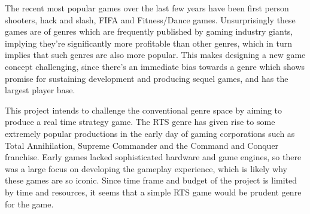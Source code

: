 The recent most popular games over the last few years have been first person shooters, hack and slash, FIFA and  Fitness/Dance games. Unsurprisingly these games are of genres which are frequently published by gaming industry giants, implying they're significantly more profitable than other genres, which in turn implies that such genres are also more popular. This makes designing a new game concept challenging, since there's an immediate bias towards a genre which shows promise for sustaining development and producing sequel games, and has the largest player base. 

This project intends to challenge the conventional genre space by aiming to produce a real time strategy game. The RTS genre has given rise to some extremely popular productions in the early day of gaming corporations such as Total Annihilation, Supreme Commander and the Command and Conquer franchise. Early games lacked sophisticated hardware and game engines, so there was a large focus on developing the gameplay experience, which is likely why these games are so iconic. Since time frame and budget of the project is limited by time and resources, it seems that a simple RTS game would be prudent genre for the game.
